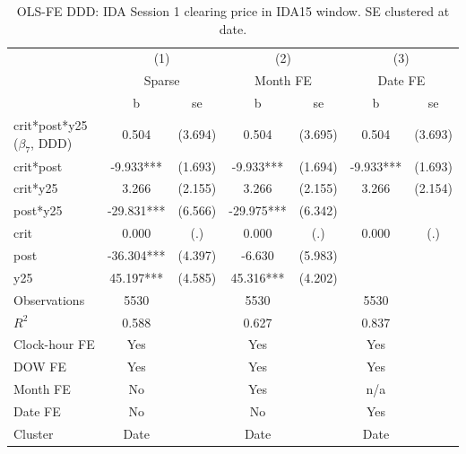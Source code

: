 \begin{table}[htbp]\centering
\def\sym#1{\ifmmode^{#1}\else\(^{#1}\)\fi}
\caption{OLS-FE DDD: IDA Session 1 clearing price in IDA15 window. SE clustered at date.}\label{tab:reform_ddd_ida15_ida}
\begin{tabular}{l*{3}{cc}}
\toprule
                    &\multicolumn{2}{c}{(1)}     &\multicolumn{2}{c}{(2)}     &\multicolumn{2}{c}{(3)}     \\
                    &\multicolumn{2}{c}{Sparse}  &\multicolumn{2}{c}{Month FE}&\multicolumn{2}{c}{Date FE} \\
                    &           b   &          se&           b   &          se&           b   &          se\\
\midrule
crit*post*y25 ($\beta_7$, DDD)&       0.504   &     (3.694)&       0.504   &     (3.695)&       0.504   &     (3.693)\\
crit*post           &      -9.933***&     (1.693)&      -9.933***&     (1.694)&      -9.933***&     (1.693)\\
crit*y25            &       3.266   &     (2.155)&       3.266   &     (2.155)&       3.266   &     (2.154)\\
post*y25            &     -29.831***&     (6.566)&     -29.975***&     (6.342)&               &            \\
crit                &       0.000   &         (.)&       0.000   &         (.)&       0.000   &         (.)\\
post                &     -36.304***&     (4.397)&      -6.630   &     (5.983)&               &            \\
y25                 &      45.197***&     (4.585)&      45.316***&     (4.202)&               &            \\
\midrule
Observations        &        5530   &            &        5530   &            &        5530   &            \\
$R^2$               &       0.588   &            &       0.627   &            &       0.837   &            \\
Clock-hour FE       &         Yes   &            &         Yes   &            &         Yes   &            \\
DOW FE              &         Yes   &            &         Yes   &            &         Yes   &            \\
Month FE            &          No   &            &         Yes   &            &         n/a   &            \\
Date FE             &          No   &            &          No   &            &         Yes   &            \\
Cluster             &        Date   &            &        Date   &            &        Date   &            \\
\bottomrule
\end{tabular}
\end{table}
